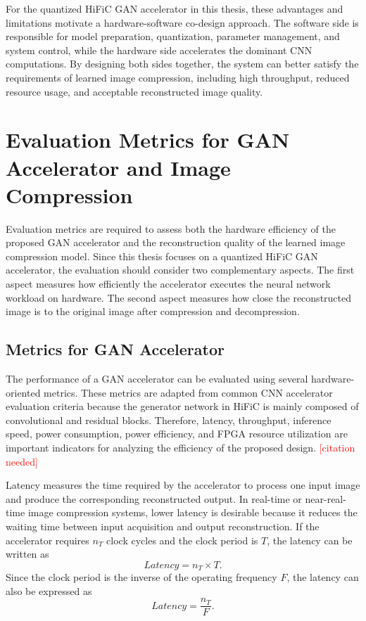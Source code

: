 \documentclass[11pt]{report}
\begin{document}
For the quantized HiFiC GAN accelerator in this thesis, these advantages and limitations motivate a hardware-software co-design approach. The software side is responsible for model preparation, quantization, parameter management, and system control, while the hardware side accelerates the dominant CNN computations. By designing both sides together, the system can better satisfy the requirements of learned image compression, including high throughput, reduced resource usage, and acceptable reconstructed image quality.



\section{Evaluation Metrics for GAN Accelerator and Image Compression}

Evaluation metrics are required to assess both the hardware efficiency of the proposed GAN accelerator and the reconstruction quality of the learned image compression model. Since this thesis focuses on a quantized HiFiC GAN accelerator, the evaluation should consider two complementary aspects. The first aspect measures how efficiently the accelerator executes the neural network workload on hardware. The second aspect measures how close the reconstructed image is to the original image after compression and decompression.

\subsection{Metrics for GAN Accelerator}

The performance of a GAN accelerator can be evaluated using several hardware-oriented metrics. These metrics are adapted from common CNN accelerator evaluation criteria because the generator network in HiFiC is mainly composed of convolutional and residual blocks. Therefore, latency, throughput, inference speed, power consumption, power efficiency, and FPGA resource utilization are important indicators for analyzing the efficiency of the proposed design. \textcolor{red}{[citation needed]}

Latency measures the time required by the accelerator to process one input image and produce the corresponding reconstructed output. In real-time or near-real-time image compression systems, lower latency is desirable because it reduces the waiting time between input acquisition and output reconstruction. If the accelerator requires $n_T$ clock cycles and the clock period is $T$, the latency can be written as
\begin{equation}
Latency = n_T \times T.
\end{equation}
Since the clock period is the inverse of the operating frequency $F$, the latency can also be expressed as
\begin{equation}
Latency = \frac{n_T}{F}.
\end{equation}
\end{document}
